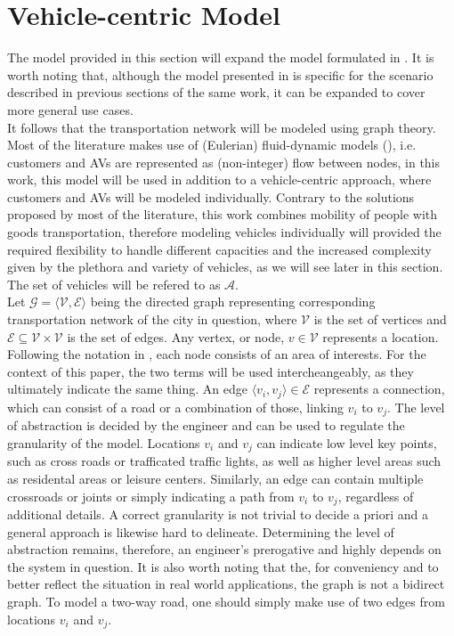 \section{Vehicle-centric Model}\label{sec:vc_model}
The model provided in this section will expand the model formulated in \cite{project_thesis}. It is worth noting that, although the model presented in \cite{project_thesis} is specific for the scenario described in previous sections of the same work, it can be expanded to cover more general use cases. \\
It follows that the transportation network will be modeled using graph theory. Most of the literature makes use of (Eulerian) fluid-dynamic models (\cite{amod_review}), i.e. customers and AVs are represented as (non-integer) flow between nodes, in this work,
this model will be used in addition to a vehicle-centric approach, where customers and AVs will be modeled individually. Contrary to the solutions proposed by most of the literature, this work combines mobility of people with goods transportation, therefore modeling vehicles individually will provided the required flexibility to handle different capacities and the increased complexity given by the plethora and variety of vehicles, as we will see later in this section. The set of vehicles will be refered to as $\mathcal{A}$. \\ 
Let $\mathcal{G} = \langle \mathcal{V}, \mathcal{E} \rangle$ being the directed graph representing corresponding transportation network of the  city in question, where $\mathcal{V}$ is the set of vertices and $\mathcal{E} \subseteq \mathcal{V} \times \mathcal{V}$ is the set of edges. Any vertex, or node,  $ v \in  \mathcal{V}$ represents a location. Following the notation in \cite{project_thesis}, each node consists of an area of interests. For the context of this paper, the two terms will be used intercheangeably, as they ultimately indicate the same thing. An edge $\langle v_i, v_j \rangle \in \mathcal{E}$ represents a connection, which can consist of a road or a combination of those, linking $v_i$ to $v_j$. The level of abstraction is decided by the engineer and can be used to regulate the granularity of the model. Locations $v_i$ and $v_j$ can indicate low level key points, such as cross roads or trafficated traffic lights, as well as higher level areas such as residental areas or leisure centers. Similarly, an edge can contain multiple crossroads or joints or simply indicating a path from $v_i$ to $v_j$, regardless of additional details. A correct granularity is not trivial to decide a priori and a general approach is likewise hard to delineate.  Determining the level of abstraction remains, therefore, an engineer's prerogative and highly depends on the system in question. It is also worth noting that the, for conveniency and to better reflect the situation in real world applications, the graph is not a bidirect graph. To model a two-way road, one should simply make use of two edges from locations $v_i$ and $v_j$. \\
